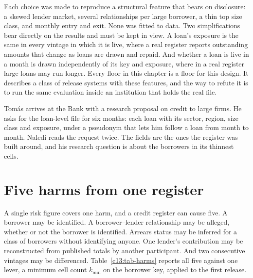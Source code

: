 Each choice was made to reproduce a structural feature that bears on disclosure: a
skewed lender market, several relationships per large borrower, a thin top size
class, and monthly entry and exit. None was fitted to data. Two simplifications bear
directly on the results and must be kept in view. A loan's exposure is the same in
every vintage in which it is live, where a real register reports outstanding amounts
that change as loans are drawn and repaid. And whether a loan is live in a month is
drawn independently of its key and exposure, where in a real register large loans
may run longer. Every floor in this chapter is a floor for this design. It describes
a class of release systems with these features, and the way to refute it is to run
the same evaluation inside an institution that holds the real file.

Tomás arrives at the Bank with a research proposal on credit to large firms. He
asks for the loan-level file for six months: each loan with its sector, region,
size class and exposure, under a pseudonym that lets him follow a loan from month to
month. Naledi reads the request twice. The fields are the ones the register was
built around, and his research question is about the borrowers in its thinnest
cells.

\section{Five harms from one register}\label{c13:sec-harms}

A single risk figure covers one harm, and a credit register can cause five. A
borrower may be identified. A borrower--lender relationship may be alleged, whether
or not the borrower is identified. Arrears status may be inferred for a class of
borrowers without identifying anyone. One lender's contribution may be reconstructed
from published totals by another participant. And two consecutive vintages may be
differenced. Table~\ref{c13:tab-harms} reports all five against one lever, a minimum
cell count $k_{\min}$ on the borrower key, applied to the first release.

